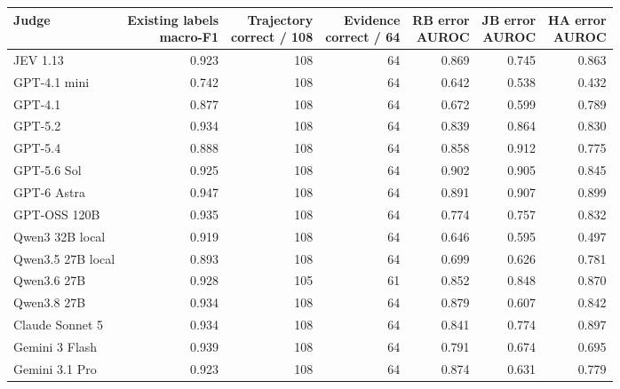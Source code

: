 \begin{tabular}{@{}lrrrrrr@{}}
\toprule
Judge & \shortstack{Existing labels\\macro-F1} & \shortstack{Trajectory\\correct / 108} & \shortstack{Evidence\\correct / 64} & \shortstack{RB error\\AUROC} & \shortstack{JB error\\AUROC} & \shortstack{HA error\\AUROC} \\
\midrule
JEV 1.13 & 0.923 & 108 & 64 & 0.869 & 0.745 & 0.863 \\
GPT-4.1 mini & 0.742 & 108 & 64 & 0.642 & 0.538 & 0.432 \\
GPT-4.1 & 0.877 & 108 & 64 & 0.672 & 0.599 & 0.789 \\
GPT-5.2 & 0.934 & 108 & 64 & 0.839 & 0.864 & 0.830 \\
GPT-5.4 & 0.888 & 108 & 64 & 0.858 & 0.912 & 0.775 \\
GPT-5.6 Sol & 0.925 & 108 & 64 & 0.902 & 0.905 & 0.845 \\
GPT-6 Astra & 0.947 & 108 & 64 & 0.891 & 0.907 & 0.899 \\
GPT-OSS 120B & 0.935 & 108 & 64 & 0.774 & 0.757 & 0.832 \\
Qwen3 32B local & 0.919 & 108 & 64 & 0.646 & 0.595 & 0.497 \\
Qwen3.5 27B local & 0.893 & 108 & 64 & 0.699 & 0.626 & 0.781 \\
Qwen3.6 27B & 0.928 & 105 & 61 & 0.852 & 0.848 & 0.870 \\
Qwen3.8 27B & 0.934 & 108 & 64 & 0.879 & 0.607 & 0.842 \\
Claude Sonnet 5 & 0.934 & 108 & 64 & 0.841 & 0.774 & 0.897 \\
Gemini 3 Flash & 0.939 & 108 & 64 & 0.791 & 0.674 & 0.695 \\
Gemini 3.1 Pro & 0.923 & 108 & 64 & 0.874 & 0.631 & 0.779 \\
\bottomrule
\end{tabular}
